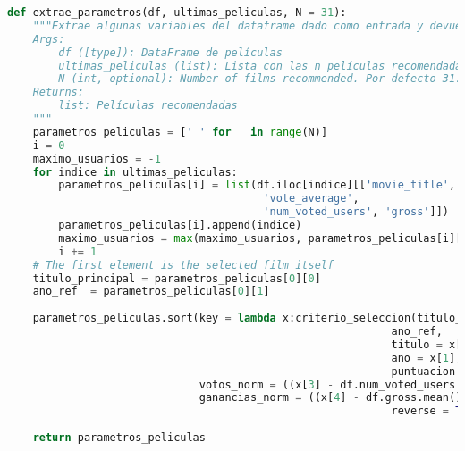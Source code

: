 \begin{lstlisting}[language=Python, caption={Extrae algunas variables del dataframe dado como entrada y devuelve la lista de N películas. Esta lista se ordena de acuerdo al criterio de la función criterio\_seleccion, definida en el \autoref{lst:criteria}}]
def extrae_parametros(df, ultimas_peliculas, N = 31):
    """Extrae algunas variables del dataframe dado como entrada y devuelve la lista de N películas. Esta lista se ordena de acuerdo al criterio de la función criterio_seleccion.
    Args:
        df ([type]): DataFrame de películas
        ultimas_peliculas (list): Lista con las n películas recomendadas
        N (int, optional): Number of films recommended. Por defecto 31.
    Returns:
        list: Películas recomendadas
    """
    parametros_peliculas = ['_' for _ in range(N)]
    i = 0
    maximo_usuarios = -1
    for indice in ultimas_peliculas:
        parametros_peliculas[i] = list(df.iloc[indice][['movie_title', 'title_year',
                                        'vote_average', 
                                        'num_voted_users', 'gross']])
        parametros_peliculas[i].append(indice)
        maximo_usuarios = max(maximo_usuarios, parametros_peliculas[i][4] )
        i += 1
    # The first element is the selected film itself
    titulo_principal = parametros_peliculas[0][0]
    ano_ref  = parametros_peliculas[0][1]
    
    parametros_peliculas.sort(key = lambda x:criterio_seleccion(titulo_principal,
                                                            ano_ref, 
                                                            titulo = x[0], 
                                                            ano = x[1],
                                                            puntuacion = x[2],
                              votos_norm = ((x[3] - df.num_voted_users.mean())/df.num_voted_users.std()),
                              ganancias_norm = ((x[4] - df.gross.mean())/df.gross.std())),
                                                            reverse = True)
    
    return parametros_peliculas
\end{lstlisting}


